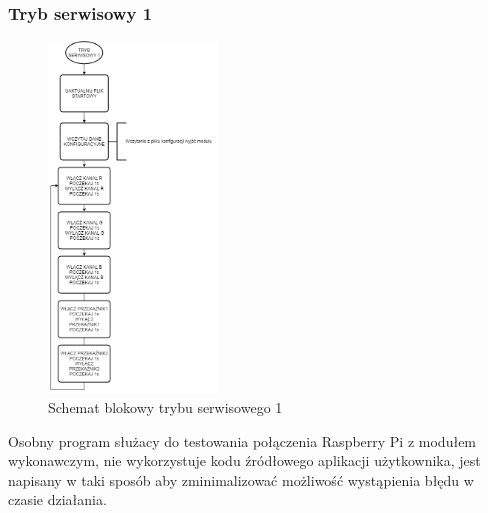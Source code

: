\documentclass[12pt, eng, twoside, openany, final]{mgr}
\begin{document}
                    \subsubsection{Tryb serwisowy 1}
                        \begin{figure}[H]
                        \begin{center}
                            \includegraphics[width=0.4\textwidth]{t1.png}
                            \caption{Schemat blokowy trybu serwisowego 1} \label{fig:serT1}
                        \end{center}
                        \end{figure}
                        Osobny program służacy do testowania połączenia Raspberry Pi z modułem wykonawczym, nie wykorzystuje kodu źródłowego aplikacji użytkownika, jest napisany w taki sposób aby zminimalizować możliwość wystąpienia błędu w czasie działania.
                        \newpage
                    
\end{document}

